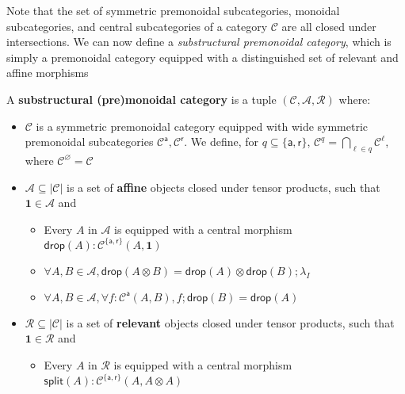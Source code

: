 \documentclass[acmsmall,screen,review]{acmart}
\newcommand{\mc}[1]{\ensuremath{\mathcal{#1}}}
\newcommand{\mb}[1]{\ensuremath{\mathbf{#1}}}
\newcommand{\ms}[1]{\ensuremath{\mathsf{#1}}}
\begin{document}
Note that the set of symmetric premonoidal subcategories, monoidal
subcategories, and central subcategories of a category \(\mc{C}\) are all closed
under intersections.
%
%
%
We can now define a \textit{substructural premonoidal category}, which is simply
a premonoidal category equipped with a distinguished set of relevant and affine
morphisms
\begin{definition}
  A \textbf{substructural (pre)monoidal category} is a tuple \((\mc{C}, \mc{A},
  \mc{R})\) where:
  \begin{itemize}
    \item \(\mc{C}\) is a symmetric premonoidal category equipped with wide
    symmetric premonoidal subcategories \(\mc{C}^{\ms{a}}, \mc{C}^{\ms{r}}\).
    We define, for \(q \subseteq \{\ms{a}, \ms{r}\}\), \(\mc{C}^q = \bigcap_{\ell \in q}\mc{C}^\ell\), where \(\mc{C}^\varnothing = \mc{C}\)
    \item \(\mc{A} \subseteq |\mc{C}|\) is a set of \textbf{affine} objects
    closed under tensor products, such that \(\mb{1} \in \mc{A}\) and
    \begin{itemize}
      \item Every \(A\) in \(\mc{A}\) is equipped with a central morphism
      \(\ms{drop}(A): \mc{C}^{\{\ms{a}, \ms{r}\}}(A, \mb{1})\)
      \item \(\forall A, B \in \mc{A}, \ms{drop}(A \otimes B) = \ms{drop}(A) \otimes \ms{drop}(B);\lambda_I\)
      \item \(\forall A, B \in \mc{A}, \forall f: \mc{C}^{\ms{a}}(A, B), f;\ms{drop}(B) = \ms{drop}(A)\)
    \end{itemize}
    \item \(\mc{R} \subseteq |\mc{C}|\) is a set of \textbf{relevant} objects
    closed under tensor products, such that \(\mb{1} \in \mc{R}\) and
    \begin{itemize}
      \item Every \(A\) in \(\mc{R}\) is equipped with a central morphism
      \(\ms{split}(A): \mc{C}^{\{\ms{a}, \ms{r}\}}(A, A \otimes A)\)

\end{itemize}
\end{itemize}
\end{definition}
\end{document}
